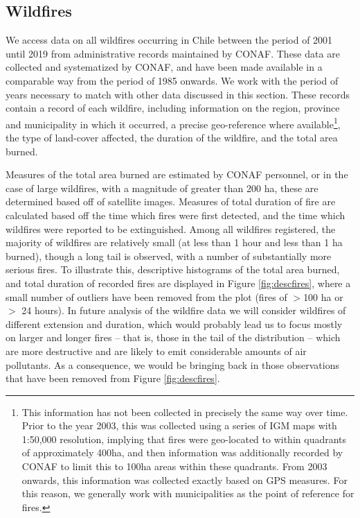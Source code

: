 \documentclass[11pt]{article}
\begin{document}
\begin{spacing}{1.3}
\subsection{Wildfires}
\label{sscn:fires} 
We access data on all wildfires occurring in Chile between the period of 2001 until 2019 from administrative records maintained by CONAF.  These data are collected and systematized by CONAF, and have been made available in a comparable way from the period of 1985 onwards. We work with the period of years necessary to match with other data discussed in this section.  These records contain a record of each wildfire, including information on the region, province and municipality in which it occurred, a precise geo-reference where available\footnote{This information has not been collected in precisely the same way over time.  Prior to the year 2003, this was collected using a series of IGM maps with 1:50,000 resolution, implying that fires were geo-located to within quadrants of approximately 400ha, and then information was additionally recorded by CONAF to limit this to 100ha areas within these quadrants.  From 2003 onwards, this information was collected exactly based on GPS measures.  For this reason, we generally work with municipalities as the point of reference for fires.}, the type of land-cover affected, the duration of the wildfire, and the total area burned.  

Measures of the total area burned are estimated by CONAF personnel, or in the case of large wildfires, with a magnitude of greater than 200 ha, these are determined based off of satellite images. Measures of total duration of fire are calculated based off the time which fires were first detected, and the time which wildfires were reported to be extinguished.  Among all wildfires registered, the majority of wildfires are relatively small (at less than 1 hour and less than 1 ha burned), though a long tail is observed, with a number of substantially more serious fires.  To illustrate this, descriptive histograms of the total area burned, and total duration of recorded fires are displayed in Figure \ref{fig:descfires}, where a small number of outliers have been removed from the plot (fires of $>$100 ha or $>$ 24 hours).
In future analysis of the wildfire data we will consider wildfires of different extension and duration, which would probably lead us to focus mostly on larger and longer fires -- that is, those in the tail of the distribution  -- which are more destructive and are likely to emit considerable amounts of air pollutants. As a consequence, we would be bringing back in those observations that have been removed from Figure \ref{fig:descfires}.


\end{spacing}
\end{document}
